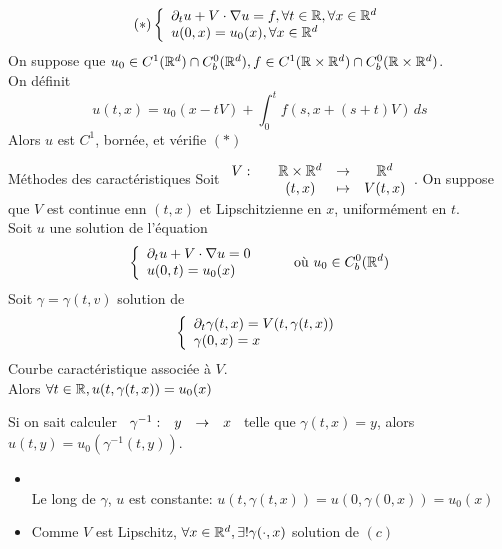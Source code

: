\documentclass[]{report}
\begin{document}
    \begin{prop}{}{}
        \[(*)\left\{\begin{array}{ll} \partial_t u+ V\cdot \nabla u=f,\forall t\in \mathbb{R},\forall x\in \mathbb{R}^d \\ u(0,x)=u_0(x),\forall x\in \mathbb{R}^d \end{array} \right.\]
        On suppose que $u_0\in C^1(\mathbb{R}^d)\cap C^0_b(\mathbb{R}^d),f\in C^1(\mathbb{R}\times \mathbb{R}^d)\cap C^0_b(\mathbb{R}\times \mathbb{R}^d)$.\\
        On définit 
        \[u(t,x)=u_0(x-tV)+\int_{0}^{t} f(s,x+(s+t)V)\, ds\]
        Alors $u$ est $C^1$, bornée, et vérifie $(*)$
    \end{prop}

    \begin{prop}{Méthodes des caractéristiques}{}
        Soit $\begin{array}{ccccc} V : & & \mathbb{R}\times \mathbb{R}^d & \to & \mathbb{R}^d \\ & & (t,x) & \mapsto & V(t,x) \end{array}$. On suppose que $V$ est continue enn $(t,x)$ et Lipschitzienne en $x$, uniformément en $t$.\\
        Soit $u$ une solution de l'équation
        \[\left\{\begin{array}{ll} \partial_t u+V\cdot \nabla u=0\\ u(0,t)=u_0(x) \end{array} \right.\qquad \text{ où $u_0\in C_b^0(\mathbb{R}^d)$}\]
        Soit $\gamma=\gamma(t,v)$ solution de
        \[\left\{\begin{array}{ll} \partial_t \gamma(t,x)=V(t,\gamma(t,x))\\ \gamma(0,x)=x \end{array} \right.\]
        Courbe caractéristique associée à $V$.\\
        Alors $\forall t\in \mathbb{R},u(t,\gamma(t,x))=u_0(x)$
    \end{prop}

    \begin{re}{}{}
        Si on sait calculer $\begin{array}{ccccc} \gamma^{-1} : & y & \to & x \end{array}$ telle que $\gamma(t,x)=y$, alors $u(t,y)=u_0(\gamma^{-1}(t,y))$.
        \begin{itemize}
            \item {}\\
            Le long de $\gamma$, $u$ est constante: $u(t,\gamma(t,x))=u(0,\gamma(0,x))=u_0(x)$
            \item Comme $V$ est Lipschitz, $\forall x\in \mathbb{R}^d,\exists! \gamma(\cdot,x)$ solution de $(c)$
        \end{itemize}
    \end{re}
\end{document}
